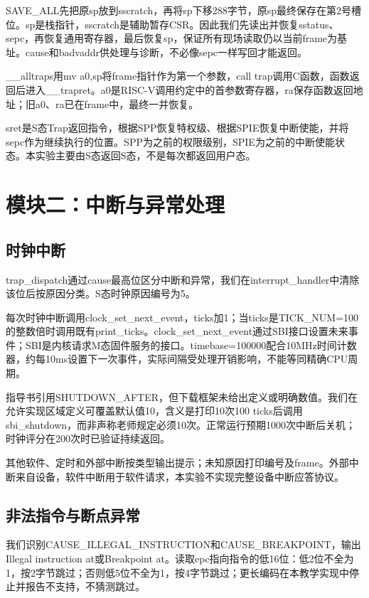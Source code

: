\documentclass[UTF8,a4paper,10pt]{ctexart}
\begin{document}
SAVE\_ALL先把原sp放到sscratch，再将sp下移288字节，原sp最终保存在第2号槽位。sp是栈指针，sscratch是辅助暂存CSR。因此我们先读出并恢复sstatus、sepc，再恢复通用寄存器，最后恢复sp，保证所有现场读取仍以当前frame为基址。cause和badvaddr供处理与诊断，不必像sepc一样写回才能返回。


\_\_alltraps用mv a0,sp将frame指针作为第一个参数，call trap调用C函数，函数返回后进入\_\_trapret。a0是RISC-V调用约定中的首参数寄存器，ra保存函数返回地址；旧a0、ra已在frame中，最终一并恢复。


sret是S态Trap返回指令，根据SPP恢复特权级、根据SPIE恢复中断使能，并将sepc作为继续执行的位置。SPP为之前的权限级别，SPIE为之前的中断使能状态。本实验主要由S态返回S态，不是每次都返回用户态。


\section{模块二：中断与异常处理}

\subsection{时钟中断}

trap\_dispatch通过cause最高位区分中断和异常，我们在interrupt\_handler中清除该位后按原因分类。S态时钟原因编号为5。


每次时钟中断调用clock\_set\_next\_event，ticks加1；当ticks是TICK\_NUM=100的整数倍时调用既有print\_ticks。clock\_set\_next\_event通过SBI接口设置未来事件；SBI是内核请求M态固件服务的接口。timebase=100000配合10MHz时间计数器，约每10ms设置下一次事件，实际间隔受处理开销影响，不能等同精确CPU周期。


指导书引用SHUTDOWN\_AFTER，但下载框架未给出定义或明确数值。我们在允许实现区域定义可覆盖默认值10，含义是打印10次100 ticks后调用sbi\_shutdown，而非声称老师规定必须10次。正常运行预期1000次中断后关机；时钟评分在200次时已验证持续返回。


其他软件、定时和外部中断按类型输出提示；未知原因打印编号及frame。外部中断来自设备，软件中断用于软件请求，本实验不实现完整设备中断应答协议。


\subsection{非法指令与断点异常}

我们识别CAUSE\_ILLEGAL\_INSTRUCTION和CAUSE\_BREAKPOINT，输出Illegal instruction at或Breakpoint at。读取epc指向指令的低16位：低2位不全为1，按2字节跳过；否则低5位不全为1，按4字节跳过；更长编码在本教学实现中停止并报告不支持，不猜测跳过。
\end{document}
